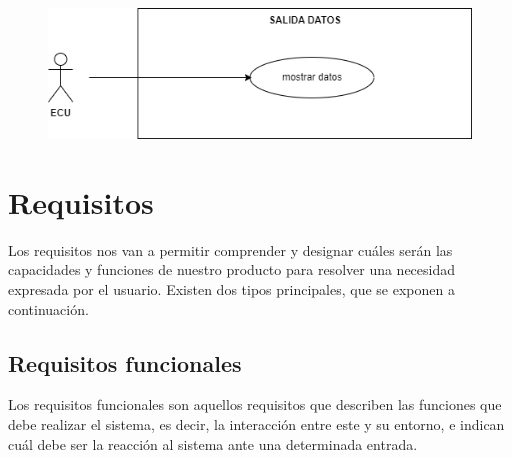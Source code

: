 \begin{figure}[H]
    \centering
    \includegraphics[width=1\textwidth]{imagenes/diagrama_CU_3.png}
\end{figure}


\section{Requisitos}

Los requisitos nos van a permitir comprender y designar cuáles serán las capacidades y funciones de nuestro producto para resolver una necesidad expresada por el usuario. Existen dos tipos principales, que se exponen a continuación.

\subsection*{Requisitos funcionales}

Los requisitos funcionales son aquellos requisitos que describen las funciones que debe realizar el sistema, es decir, la interacción entre este y su entorno, e indican cuál debe ser la reacción al sistema ante una determinada entrada. 

\begin{table}[H]
    \end{table}

